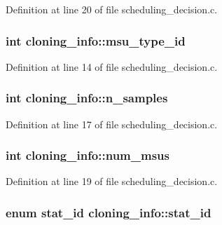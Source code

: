 Definition at line 20 of file scheduling\-\_\-decision.\-c.

\hypertarget{structcloning__info_a33d2da60c6da8d63787ccd31abb1dcd2}{
\subsubsection[{msu\-\_\-type\-\_\-id}]{\setlength{\rightskip}{0pt plus 5cm}int cloning\-\_\-info\-::msu\-\_\-type\-\_\-id}}\label{structcloning__info_a33d2da60c6da8d63787ccd31abb1dcd2}


Definition at line 14 of file scheduling\-\_\-decision.\-c.

\hypertarget{structcloning__info_a40588709a6807365c9d2a8554f08054d}{
\subsubsection[{n\-\_\-samples}]{\setlength{\rightskip}{0pt plus 5cm}int cloning\-\_\-info\-::n\-\_\-samples}}\label{structcloning__info_a40588709a6807365c9d2a8554f08054d}


Definition at line 17 of file scheduling\-\_\-decision.\-c.

\hypertarget{structcloning__info_a0d133d4ff8e0148eee7cda34b3e5627f}{
\subsubsection[{num\-\_\-msus}]{\setlength{\rightskip}{0pt plus 5cm}int cloning\-\_\-info\-::num\-\_\-msus}}\label{structcloning__info_a0d133d4ff8e0148eee7cda34b3e5627f}


Definition at line 19 of file scheduling\-\_\-decision.\-c.

\hypertarget{structcloning__info_ae9b537be6398899a7e53f694445bc867}{
\subsubsection[{stat\-\_\-id}]{\setlength{\rightskip}{0pt plus 5cm}enum {\bf stat\-\_\-id} cloning\-\_\-info\-::stat\-\_\-id}}\label{structcloning__info_ae9b537be6398899a7e53f694445bc867}


